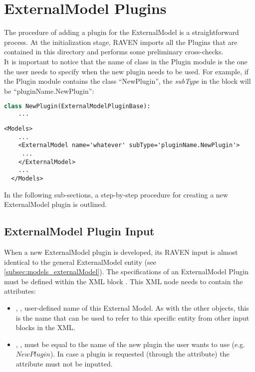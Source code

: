 \section{ExternalModel Plugins}
\label{sec:newExternalModelPlugin}

The procedure of adding a plugin for the ExternalModel is a straightforward process.
At the initialization stage, RAVEN imports all the Plugins that are contained in this directory and performs some preliminary cross-checks.
\\It is important to notice that the name of class in the Plugin module is the one the user needs to specify when the new plugin
needs to be used. For example, if the Plugin module contains the class 	``NewPlugin'', the \textit{subType}
in the  block will be 	``pluginName.NewPlugin'':
\begin{lstlisting}[language=python]
  class NewPlugin(ExternalModelPluginBase):
    ...
\end{lstlisting}
\begin{lstlisting}[style=XML,morekeywords={name,file}] %moreemph={name,file}]
  <Models>
    ...
    <ExternalModel name='whatever' subType='pluginName.NewPlugin'>
     ...
    </ExternalModel>
    ...
  </Models>
\end{lstlisting}

In the following sub-sections, a step-by-step procedure for creating a new ExternalModel plugin is outlined.

\subsection{ExternalModel Plugin Input}
\label{subsec:externalModelPluginInput}
When a new ExternalModel plugin is developed, its RAVEN input is almost identical
to the general ExternalModel entity (see \ref{subsec:models_externalModel}).
The specifications of an ExternalModel Plugin must be defined within the XML block
.
%
This XML node needs to contain the attributes:

\vspace{-5mm}
\begin{itemize}
  \itemsep0em
  \item {}, , user-defined name
  of this External Model.
  \nb As with the other objects, this is the name that can be used to refer to
  this specific entity from other input blocks in the XML.
  \item {}, , must be equal to the
  name of the new plugin the user wants to use (e.g. $NewPlugin$).
  \nb In case a plugin is requested (through the   attribute) the
  attribute  must not be inputted.
\end{itemize}
\vspace{-5mm}


